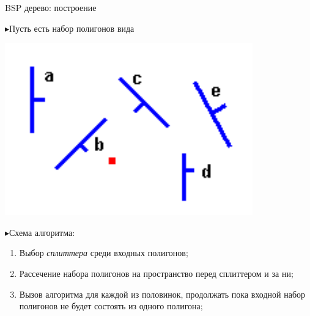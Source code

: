 \documentclass{beamer}
\newcommand{\tri}{{\color{blue!40} $\blacktriangleright$}\:}
\begin{document}
\begin{frame}{BSP дерево: построение}
\footnotesize

\tri Пусть есть набор полигонов вида
\begin{center}
\includegraphics[scale=0.4]{img1}
\end{center}

\tri Схема алгоритма:
\begin{enumerate}
    \item Выбор \emph{сплиттера} среди входных полигонов;
    \item Рассечение набора полигонов на пространство перед сплиттером и за ни;
    \item Вызов алгоритма для каждой из половинок, продолжать пока входной набор полигонов не будет состоять из одного полигона;
\end{enumerate}

\end{frame}
\end{document}
